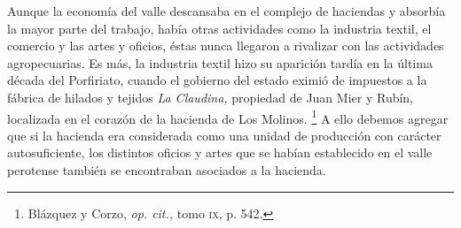 \documentclass[14pt,twoside,final]{extbook} %
\let\oldfootnote\footnote
\renewcommand\footnote[1]{%
\oldfootnote{\hspace{1mm}#1}}
\begin{document}
Aunque la economía del valle descansaba en el complejo de haciendas y absorbía la mayor parte del trabajo, había otras actividades como la industria textil, el comercio y las artes y oficios, éstas nunca llegaron a rivalizar con las actividades agropecuarias. Es más, la industria textil hizo su aparición tardía en la última década del Porfiriato, cuando el gobierno del estado eximió de impuestos a la fábrica de hilados y tejidos \emph{La Claudina,} propiedad de Juan Mier y Rubín, localizada en el corazón de la hacienda de Los Molinos.\footnote{Blázquez y Corzo, \emph{op. cit.,} tomo \textsc{ix}, p. 542.} A ello debemos agregar que si la hacienda era considerada como una unidad de producción con carácter autosuficiente, los distintos oficios y artes que se habían establecido en el valle perotense también se encontraban asociados a la hacienda.
\end{document}
